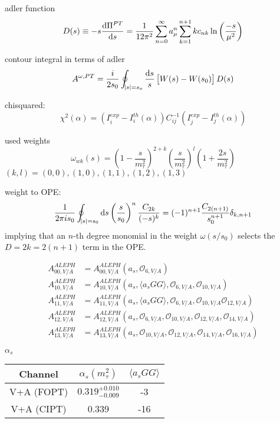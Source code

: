 \documentclass{article}
\begin{document}
  adler function
  \begin{equation}
    D(s) \equiv -s \frac{\dif \Pi^{PT}}{\dif s} = \frac{1}{12\pi^2}\sum_{n=0}^\infty a_\mu^n \sum_{k=1}^{n+1} k c_{nk} \ln\left( \frac{-s}{\mu^2} \right)
  \end{equation}

  contour integral in terms of adler
  \begin{equation}
    A^{\omega,PT} = \frac{i}{2 s_0} \oint_{\envert{s}=s_o} \frac{\dif s}{s} \left[ W(s) - W(s_0) \right] D(s)
  \end{equation}
  
  chisquared:
  \begin{equation}
    \chi^2(\alpha) = (I_i^{exp}-I_i^{th}(\alpha)) C_{ij}^{-1} (I_j^{exp}-I_j^{th}(\alpha))
  \end{equation}

  used weights
  \begin{equation}
    \omega_{wk}(s) = \left( 1 - \frac{s}{m_\tau^2} \right)^{2+k} \left( \frac{s}{m_\tau^2} \right)^l \left( 1 + \frac{2s}{m_\tau^2} \right)
  \end{equation}
  $(k,l) = {(0,0), (1,0), (1,1), (1,2), (1,3)}$

  weight to OPE:
  \begin{equation}
    \frac{1}{2 \pi i s_0} \oint_{\envert{s}=s_0} \dif s \left( \frac{s}{s_0} \right)^n \frac{C_{2k}}{(-s)^k} = (-1)^{n+1} \frac{C_{2(n+1)}}{s_0^{n+1}} \delta_{k,n+1}
  \end{equation}
  implying that an $n$-th degree monomial in the weight $\omega(s/s_0)$ selects
  the $D=2k=2(n+1)$ term in the OPE.

  \begin{equation}
    \begin{split}
      A_{00,V/A}^{ALEPH} &= A_{00,V/A}^{ALEPH}(a_s, \mathcal{O}_{6,V/A}) \\
      A_{10,V/A}^{ALEPH} &= A_{10,V/A}^{ALEPH}(a_s,\langle a_s GG \rangle, \mathcal{O}_{6,V/A}, \mathcal{O}_{10,V/A}) \\
      A_{11,V/A}^{ALEPH} &= A_{11,V/A}^{ALEPH}(a_s,\langle a_s GG \rangle, \mathcal{O}_{6,V/A}, \mathcal{O}_{10,V/A} \mathcal{O}_{12,V/A}) \\
      A_{12,V/A}^{ALEPH} &= A_{12,V/A}^{ALEPH}(a_s, \mathcal{O}_{6,V/A}, \mathcal{O}_{10,V/A}, \mathcal{O}_{12,V/A}, \mathcal{O}_{14,V/A}) \\
      A_{13,V/A}^{ALEPH} &= A_{13,V/A}^{ALEPH}(a_s, \mathcal{O}_{10,V/A}, \mathcal{O}_{12,V/A}, \mathcal{O}_{14,V/A}, \mathcal{O}_{16,V/A})
    \end{split} 
  \end{equation}

  $\alpha_s$
  \begin{center}
    \begin{tabular}{| c | c | c |}
      \hline
      Channel & $\alpha_s(m_\tau^2)$ & $\langle a_sGG \rangle$ \\ 
      \hline
      V+A (FOPT) & $0.319^{+0.010}_{-0.009}$ & -3 \\  
      \hline
      V+A (CIPT) & 0.339 & -16 \\    
      \hline
    \end{tabular}
  \end{center}
  
\end{document}

